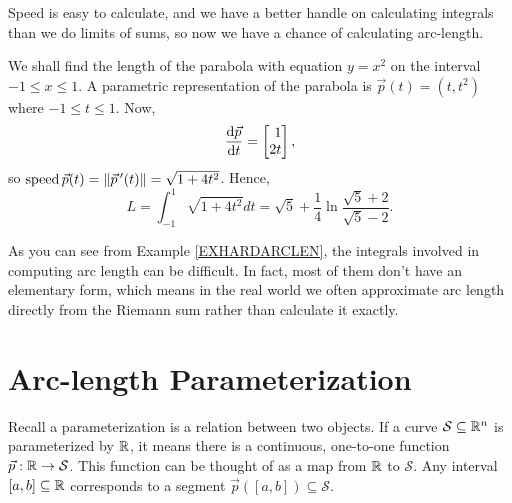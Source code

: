 Speed is easy to calculate, and we have a better handle on calculating integrals than we do 
limits of sums, so now we have a chance of calculating arc-length.

\begin{example}
	\label{EXHARDARCLEN}
We shall find the length of the parabola with equation $y = x^2$
on the interval $-1\le x \le 1$.   A parametric representation
	of the parabola is $\vec p(t) = (t,t^2)$
where $-1 \le t \le 1$.  
Now,
\[
	\frac{\d\vec p}{\d t} = \mat{1\\2t},
\]
so $\operatorname{speed} \vec p(t)=\lVert\vec p\,'(t)\rVert = \sqrt{ 1 + 4t^2}$.
Hence,
\[
  L = \int_{-1}^1 \sqrt{1 + 4t^2} dt = \sqrt 5 + 
\frac 14\ln\frac{\sqrt 5 + 2}{\sqrt 5 - 2}.
\]
\end{example}

As you can see from Example \ref{EXHARDARCLEN}, the integrals involved in computing
arc length can be difficult.  In fact, most of them don't have an elementary form, which
means in the real world we often approximate arc length directly from the Riemann sum
rather than calculate it exactly.

\begin{exercises}
\end{exercises}

\section{Arc-length Parameterization}

Recall a parameterization is a relation between two objects.  If a curve $\mathcal S\subseteq\mathbb{R}^n$
is parameterized by $\mathbb{R}$, it means there is a continuous, one-to-one function $\vec p:\mathbb{R}\to\mathcal S$.
This function can be thought of as a map from $\mathbb{R}$ to $\mathcal S$.  Any interval $[a,b]\subseteq\mathbb{R}$
corresponds to a segment $\vec p([a,b])\subseteq \mathcal S$.

